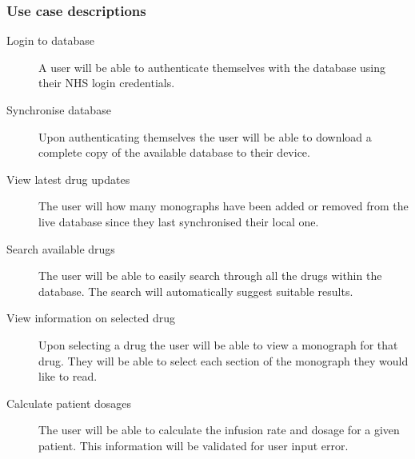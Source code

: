 \documentclass[11pt,fleqn,twoside]{article}
\begin{document}
\subsubsection{Use case descriptions}
\begin{description}
	\item[Login to database]  A user will be able to authenticate themselves with the database using their NHS login credentials.
	\item[Synchronise database] Upon authenticating themselves the user will be able to download a complete copy of the available database to their device.
	\item[View latest drug updates] The user will how many monographs have been added or removed from the live database since they last synchronised their local one.
	\item[Search available drugs] The user will be able to easily search through all the drugs within the database. The search will automatically suggest suitable results.
	\item[View information on selected drug] Upon selecting a drug the user will be able to view a monograph for that drug. They will be able to select each section of the monograph they would like to read.
	\item[Calculate patient dosages] The user will be able to calculate the infusion rate and dosage for a given patient. This information will be validated for user input error. 
\end{description}
\newpage
\end{document}
